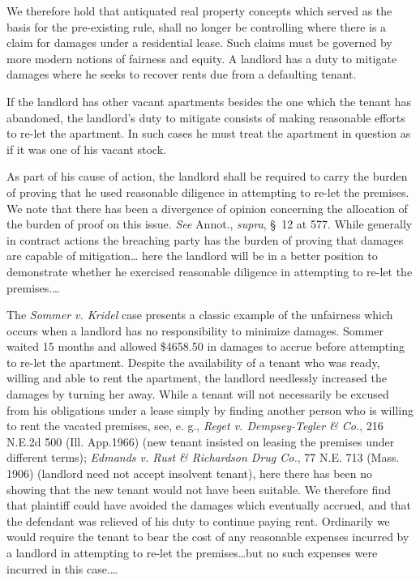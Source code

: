 We therefore hold that antiquated real property concepts which served as the
basis for the pre-existing rule, shall no longer be controlling where there is
a claim for damages under a residential lease. Such claims must be governed by
more modern notions of fairness and equity. A landlord has a duty to mitigate
damages where he seeks to recover rents due from a defaulting tenant.

If the landlord has other vacant apartments besides the one which the tenant has
abandoned, the landlord's duty to mitigate consists of making reasonable
efforts to re-let the apartment. In such cases he must treat the apartment in
question as if it was one of his vacant stock.

As part of his cause of action, the landlord shall be required to carry the
burden of proving that he used reasonable diligence in attempting to re-let the
premises. We note that there has been a divergence of opinion concerning the
allocation of the burden of proof on this issue. \textit{See} Annot.,
\textit{supra}, \S~12 at 577. While generally in contract actions the breaching
party has the burden of proving that damages are capable of mitigation\ldots
here the landlord will be in a better position to demonstrate whether he
exercised reasonable diligence in attempting to re-let the premises.\ldots


The \textit{Sommer v. Kridel} case presents a classic example of the unfairness
which occurs when a landlord has no responsibility to minimize damages. Sommer
waited 15 months and allowed \$4658.50 in damages to accrue before attempting
to re-let the apartment. Despite the availability of a tenant who was ready,
willing and able to rent the apartment, the landlord needlessly increased the
damages by turning her away. While a tenant will not necessarily be excused
from his obligations under a lease simply by finding another person who is
willing to rent the vacated premises, see, e. g., \textit{Reget v.
Dempsey-Tegler \& Co.}, 216 N.E.2d 500 (Ill. App.1966) (new tenant insisted on
leasing the premises under different terms); \textit{Edmands v. Rust \&
Richardson Drug Co.}, 77 N.E. 713 (Mass. 1906) (landlord need not accept
insolvent tenant), here there has been no showing that the new tenant would not
have been suitable. We therefore find that plaintiff could have avoided the
damages which eventually accrued, and that the defendant was relieved of his
duty to continue paying rent. Ordinarily we would require the tenant to bear
the cost of any reasonable expenses incurred by a landlord in attempting to
re-let the premises\ldots but no such expenses were incurred in this case.\ldots

